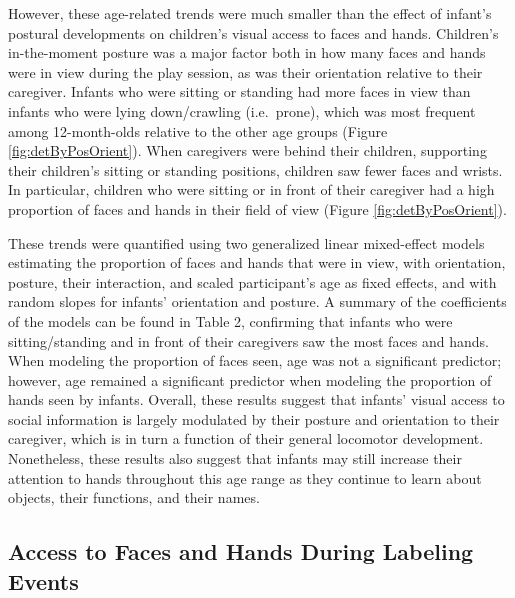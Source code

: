 \documentclass[english,man,floatsintext]{apa6}
\begin{document}
However, these age-related trends were much smaller than the effect of
infant's postural developments on children's visual access to faces and
hands. Children's in-the-moment posture was a major factor both in how
many faces and hands were in view during the play session, as was their
orientation relative to their caregiver. Infants who were sitting or
standing had more faces in view than infants who were lying
down/crawling (i.e.~prone), which was most frequent among 12-month-olds
relative to the other age groups (Figure \ref{fig:detByPosOrient}). When
caregivers were behind their children, supporting their children's
sitting or standing positions, children saw fewer faces and wrists. In
particular, children who were sitting or in front of their caregiver had
a high proportion of faces and hands in their field of view (Figure
\ref{fig:detByPosOrient}).

These trends were quantified using two generalized linear mixed-effect
models estimating the proportion of faces and hands that were in view,
with orientation, posture, their interaction, and scaled participant's
age as fixed effects, and with random slopes for infants' orientation
and posture. A summary of the coefficients of the models can be found in
Table 2, confirming that infants who were sitting/standing and in front
of their caregivers saw the most faces and hands. When modeling the
proportion of faces seen, age was not a significant predictor; however,
age remained a significant predictor when modeling the proportion of
hands seen by infants. Overall, these results suggest that infants'
visual access to social information is largely modulated by their
posture and orientation to their caregiver, which is in turn a function
of their general locomotor development. Nonetheless, these results also
suggest that infants may still increase their attention to hands
throughout this age range as they continue to learn about objects, their
functions, and their names.

\subsection{Access to Faces and Hands During Labeling
Events}\label{access-to-faces-and-hands-during-labeling-events}
\end{document}
